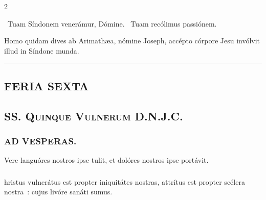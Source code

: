 \documentclass[9pt,twoside]{extarticle}
\begin{document}
\begin{multicols}{2}
\begin{tightlist}{}
\item {}~Tuam Síndonem venerámur, Dómine. ~Tuam recólimus passiónem.
\item {} Homo quidam dives ab Arimathæa, nómine Joseph, accépto córpore Jesu invólvit illud in Síndone munda.
\end{tightlist}

\begin{center}\textcolor{red}{\rule{\linewidth}{0.5pt}} \end{center}

\subsection*{\center \textsc{FERIA SEXTA}\\
}
\subsection*{\center \textsc{SS. Quinque Vulnerum D.N.J.C.}}
\subsubsection*{\center {}}
\subsubsection*{\center \textsc{AD VESPERAS.}}
\begin{tightlist}{}
\item {} Vere languóres nostros ipse tulit, et dolóres nostros ipse portávit.
\item {}
\end{tightlist}

\subsubsection*{}
hristus vulnerátus est propter iniquitátes nostras, attrítus est propter scélera nostra~: cujus livóre sanáti sumus.


\end{multicols}
\end{document}
